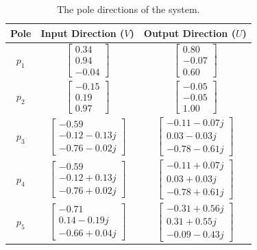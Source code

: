 \begin{table}[H]
	\centering
	\caption{The pole directions of the system.}
	\begin{tabular}{ccc}
		\hline
		\textbf{Pole} & \textbf{Input Direction ($V$)} & \textbf{Output Direction ($U$)} \\\hline
		$p_1$            &$ \begin{bmatrix} 0.34 \\ 0.94 \\ -0.04\end{bmatrix} $ & $ \begin{bmatrix} 0.80 \\ -0.07 \\ 0.60\end{bmatrix} $ \\
		$p_2$            & $ \begin{bmatrix} -0.15 \\ 0.19 \\ 0.97\end{bmatrix} $ & $ \begin{bmatrix} -0.05 \\ -0.05 \\ 1.00\end{bmatrix}$ \\
		$p_3$            & $ \begin{bmatrix} -0.59 \\ -0.12 - 0.13j \\ -0.76 - 0.02j\end{bmatrix} $ & $ \begin{bmatrix} -0.11 -0.07j \\ 0.03 - 0.03j \\ -0.78 - 0.61j\end{bmatrix} $\\
		$p_4$            & $ \begin{bmatrix} -0.59 \\ -0.12 + 0.13j \\ -0.76 + 0.02j\end{bmatrix} $ & $ \begin{bmatrix} -0.11 +0.07j \\ 0.03 + 0.03j \\ -0.78 + 0.61j\end{bmatrix} $\\
		$p_5$            & $ \begin{bmatrix} -0.71 \\ 0.14 -0.19j \\ -0.66 +0.04j\end{bmatrix} $ & $ \begin{bmatrix} -0.31+0.56j \\ 0.31+0.55j \\ -0.09 -0.43j\end{bmatrix} $ \\

\end{tabular}
\end{table}
